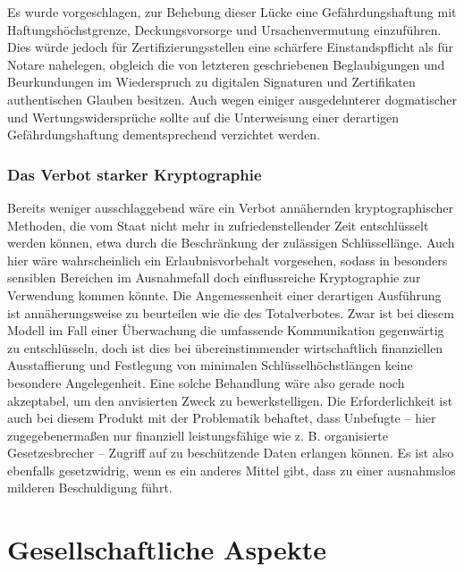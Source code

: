 Es wurde vorgeschlagen, zur Behebung dieser Lücke eine Gefährdungshaftung mit Haftungshöchstgrenze, Deckungsvorsorge und Ursachenvermutung einzuführen. Dies würde jedoch für Zertifizierungsstellen eine schärfere Einstandspflicht als für Notare nahelegen, obgleich die von letzteren geschriebenen Beglaubigungen und Beurkundungen im Wiederspruch zu digitalen Signaturen und Zertifikaten authentischen Glauben besitzen. Auch wegen einiger ausgedehnterer dogmatischer und Wertungswidersprüche sollte auf die Unterweisung einer derartigen Gefährdungshaftung dementsprechend verzichtet werden.


\subsubsection{Das Verbot starker Kryptographie}
Bereits weniger ausschlaggebend wäre ein Verbot annähernden kryptographischer Methoden, die vom Staat nicht mehr in zufriedenstellender Zeit entschlüsselt werden können, etwa durch die Beschränkung der zulässigen Schlüssellänge. Auch hier wäre wahrscheinlich ein Erlaubnisvorbehalt vorgesehen, sodass in besonders sensiblen Bereichen im Ausnahmefall doch einflussreiche Kryptographie zur Verwendung kommen könnte. Die Angemessenheit einer derartigen Ausführung ist annäherungsweise zu beurteilen wie die des Totalverbotes. Zwar ist bei diesem Modell im Fall einer Überwachung die umfassende Kommunikation gegenwärtig zu entschlüsseln, doch ist dies bei übereinstimmender wirtschaftlich finanziellen Ausstaffierung und Festlegung von minimalen Schlüsselhöchstlängen keine besondere Angelegenheit. Eine solche Behandlung wäre also gerade noch akzeptabel, um den anvisierten Zweck zu bewerkstelligen. Die Erforderlichkeit ist auch bei diesem Produkt mit der Problematik behaftet, dass Unbefugte – hier zugegebenermaßen nur finanziell leistungsfähige wie z. B. organisierte Gesetzesbrecher – Zugriff auf zu beschützende Daten erlangen können. Es ist also ebenfalls gesetzwidrig, wenn es ein anderes Mittel gibt, dass zu einer ausnahmslos milderen Beschuldigung führt.

\section{Gesellschaftliche Aspekte}
